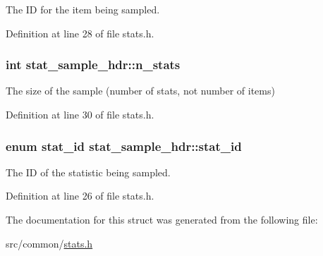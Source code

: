 The I\-D for the item being sampled. 



Definition at line 28 of file stats.\-h.

\hypertarget{structstat__sample__hdr_a597d2260ddea06ef785ead436adb277c}{
\subsubsection[{n\-\_\-stats}]{\setlength{\rightskip}{0pt plus 5cm}int stat\-\_\-sample\-\_\-hdr\-::n\-\_\-stats}}\label{structstat__sample__hdr_a597d2260ddea06ef785ead436adb277c}


The size of the sample (number of stats, not number of items) 



Definition at line 30 of file stats.\-h.

\hypertarget{structstat__sample__hdr_a742c0f6bbca05f6e9274202df2e6d6a2}{
\subsubsection[{stat\-\_\-id}]{\setlength{\rightskip}{0pt plus 5cm}enum {\bf stat\-\_\-id} stat\-\_\-sample\-\_\-hdr\-::stat\-\_\-id}}\label{structstat__sample__hdr_a742c0f6bbca05f6e9274202df2e6d6a2}


The I\-D of the statistic being sampled. 



Definition at line 26 of file stats.\-h.



The documentation for this struct was generated from the following file\-:\begin{DoxyCompactItemize}
\item 
src/common/\hyperlink{stats_8h}{stats.\-h}\end{DoxyCompactItemize}

